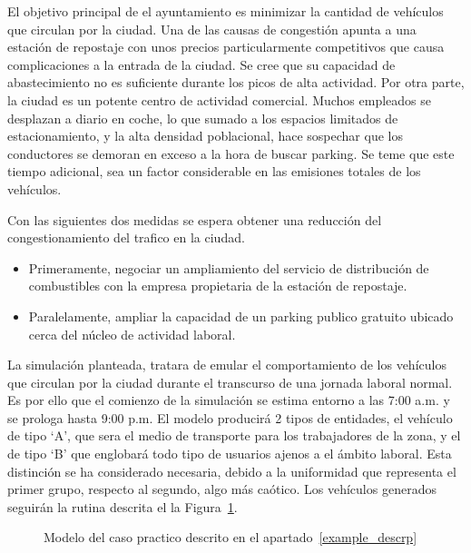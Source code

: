 El objetivo principal de el ayuntamiento es
minimizar la cantidad de vehículos que circulan por la ciudad.
Una de las causas de congestión apunta a una estación de repostaje
con unos precios particularmente competitivos
que causa complicaciones a la entrada de la ciudad.
Se cree que su capacidad de abastecimiento
no es suficiente durante los picos de alta actividad.
Por otra parte, la ciudad es un potente centro de actividad comercial.
Muchos empleados se desplazan a diario en coche,
lo que sumado a los espacios limitados de estacionamiento,
y la alta densidad poblacional,
hace sospechar que los conductores se demoran en exceso a la hora de buscar parking.
Se teme que este tiempo adicional,
sea un factor considerable en las emisiones totales de los vehículos.

Con las siguientes dos medidas se espera obtener
una reducción del congestionamiento del trafico en la ciudad.

\begin{itemize}
	\item Primeramente, negociar un ampliamiento
		del servicio de distribución de combustibles
		con la empresa propietaria de la estación de repostaje.
	\item Paralelamente, ampliar la capacidad de un parking publico gratuito
		ubicado cerca del núcleo de actividad laboral.
\end{itemize}

La simulación planteada, tratara de emular el comportamiento de los vehículos
que circulan por la ciudad durante el transcurso de una jornada laboral normal.
Es por ello que el comienzo de la simulación se estima entorno a las 7:00 a.m.
y se prologa hasta 9:00 p.m.
El modelo producirá 2 tipos de entidades,
el vehículo de tipo `A', que sera el medio de transporte para los trabajadores de la zona,
y el de tipo `B' que englobará todo tipo de usuarios ajenos a el ámbito laboral.
Esta distinción se ha considerado necesaria,
debido a la uniformidad que representa el primer grupo, respecto al segundo, algo más caótico.
Los vehículos generados seguirán la rutina descrita el la Figura~\ref{fig:2_fc_complex_ex}.

\begin{figure}
	\begin{center}
		
	\end{center}
	\caption{Modelo del caso practico descrito en el apartado~\ref{example_descrp}}
		\label{fig:2_fc_complex_ex}
\end{figure}


